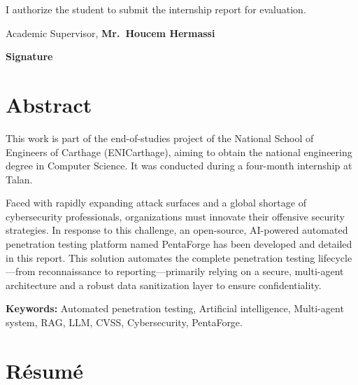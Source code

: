 \documentclass[12pt,a4paper]{report}
\begin{document}
\vspace{1.1cm}

\begin{tcolorbox}[
    enhanced,
    colback=white,
    colframe=black!70,
    boxrule=0.9pt,
    arc=4mm,
    width=\textwidth,
    left=12mm,
    right=12mm,
    top=11mm,
    bottom=11mm
]
I authorize the student to submit the internship report for evaluation.

\vspace{1.1cm}

\centering
Academic Supervisor, \textbf{Mr.\ Houcem Hermassi}

\vspace{1.6cm}

\begin{flushright}
\textbf{Signature}
\end{flushright}
\end{tcolorbox}

\newpage
\thispagestyle{fancy}
\section*{Abstract}

This work is part of the end-of-studies project of the National School of Engineers of Carthage (ENICarthage), aiming to obtain the national engineering degree in Computer Science. It was conducted during a four-month internship at Talan.

Faced with rapidly expanding attack surfaces and a global shortage of cybersecurity professionals, organizations must innovate their offensive security strategies. In response to this challenge, an open-source, AI-powered automated penetration testing platform named PentaForge has been developed and detailed in this report. This solution automates the complete penetration testing lifecycle—from reconnaissance to reporting—primarily relying on a secure, multi-agent architecture and a robust data sanitization layer to ensure confidentiality.

\vspace{0.4cm}
\noindent \textbf{Keywords:} Automated penetration testing, Artificial intelligence,
Multi-agent system, RAG, LLM, CVSS, Cybersecurity, PentaForge.

\section*{R\'{e}sum\'{e}}
\end{document}
